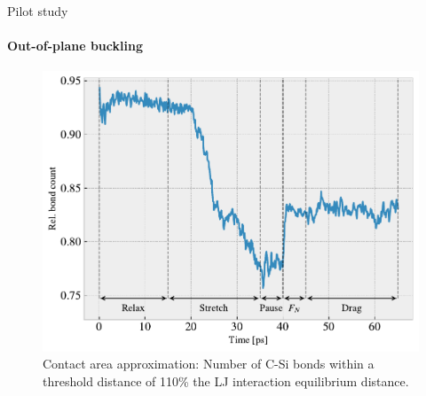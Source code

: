 \documentclass[
	10pt, %
]{beamer}
\begin{document}
%
%
\begin{frame}{Pilot study}
	\framesubtitle{Out-of-plane buckling}
	\begin{figure}
		\includegraphics[height=0.7\textheight]{figures/contact_pct.pdf}
		\caption{Contact area approximation: Number of C-Si bonds within a threshold distance of 110\% the LJ interaction equilibrium distance.}
	\end{figure}	
\end{frame}
\end{document}

